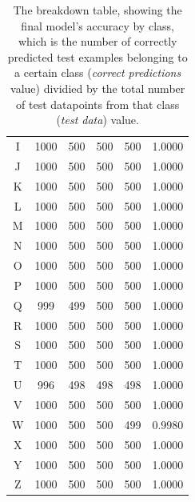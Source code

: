 \documentclass{article}
\begin{document}
\begin{center}
\begin{table}[ht]
\begin{tabular}{|c |c |c |c |c |c|}
      I & 1000 & 500 & 500 & 500 & 1.0000 \\
      
      J & 1000 & 500 & 500 & 500 & 1.0000 \\
      
      K & 1000 & 500 & 500 & 500 & 1.0000 \\
      
      L & 1000 & 500 & 500 & 500 & 1.0000 \\
      
      M & 1000 & 500 & 500 & 500 & 1.0000 \\
      
      N & 1000 & 500 & 500 & 500 & 1.0000 \\
      
      O & 1000 & 500 & 500 & 500 & 1.0000 \\
      
      P & 1000 & 500 & 500 & 500 & 1.0000 \\
      
      Q & 999 & 499 & 500 & 500 & 1.0000 \\
      
      R & 1000 & 500 & 500 & 500 & 1.0000 \\
      
      S & 1000 & 500 & 500 & 500 & 1.0000 \\
      
      T & 1000 & 500 & 500 & 500 & 1.0000 \\
      
      U & 996 & 498 & 498 & 498 & 1.0000 \\
      
      V & 1000 & 500 & 500 & 500 & 1.0000 \\
      
      W & 1000 & 500 & 500 & 499 & 0.9980 \\
      
      X & 1000 & 500 & 500 & 500 & 1.0000 \\
      
      Y & 1000 & 500 & 500 & 500 & 1.0000 \\
      
      Z & 1000 & 500 & 500 & 500 & 1.0000 \\
      \hline
    \end{tabular}
    \caption{The breakdown table, showing the final model's accuracy by class, which is the number of correctly predicted test examples belonging to a certain class 
    (\textit{correct predictions} value) dividied by the total number of test datapoints from that class (\textit{test data}) value.}
    \label{table:1}
  \end{table}
\end{center}
\end{document}
